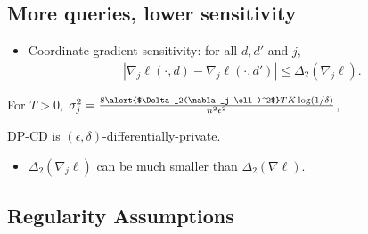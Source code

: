 \documentclass{beamer}
\newcommand{\abs}[1]{\left| #1 \right|}
\begin{document}


\subsection{More queries, lower sensitivity}
\begin{frame}
  \begin{itemize}
  \item
    Coordinate gradient \alert{sensitivity}: for all $d, d'$ and $j$,
    \begin{align*}
      \abs{\nabla_j\ell(\cdot, d) - \nabla_j\ell(\cdot, d')} \le \Delta_2(\nabla_j\ell).
    \end{align*}
  \end{itemize}

  \vspace{2em}

  \begin{theorem}
    For $T > 0$,
    $\sigma_j^2 = \frac{8\text{\alert{$\Delta_2(\nabla_j \ell)^2$}} TK \log(1/\delta)}{n^2\epsilon^2}$, \\
    \begin{center}
      DP-CD is $(\epsilon,\delta)$-differentially-private.
    \end{center}
  \end{theorem}

  \begin{itemize}
  \item $\Delta_2(\nabla_j \ell)$ can be \alert{much smaller} than $\Delta_2(\nabla \ell)$.
  \end{itemize}
\end{frame}

\subsection{Regularity Assumptions}
\end{document}
